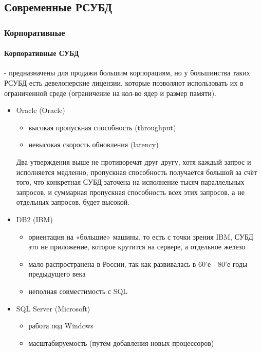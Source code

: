\subsection{Современные РСУБД}
\subsubsection{Корпоративные}

\paragraph{Корпоративные СУБД} - предназначены для продажи большим корпорациям, но у большинства
таких РСУБД есть девелоперские лицензии, которые позволяют использовать их в ограниченной среде (ограничение на кол-во ядер и размер памяти).

\begin{itemize}
	\item Oracle (Oracle)
	      \begin{itemize}
		      \item высокая пропускная способность (throughput)
		      \item невысокая скорость обновления (latency)
	      \end{itemize}
	      \begin{remark}
		      Два утверждения выше не противоречат друг другу, хотя каждый запрос и исполняется медленно, пропускная способность получается большой за счёт того, что конкретная СУБД заточена на исполнение тысяч параллельных запросов, и суммарная пропускная способность всех этих запросов, а не отдельных запросов, будет высокой.
	      \end{remark}
	\item DB2 (IBM)
	      \begin{itemize}
		      \item ориентация на «большие» машины, то есть с точки зрения IBM, СУБД это не приложение, которое крутится на сервере, а отдельное железо
		      \item мало распространена в России, так как развивалась в 60'е - 80'е годы предыдущего века
		      \item неполная совместимость с SQL
	      \end{itemize}
	\item SQL Server (Microsoft)
	      \begin{itemize}
		      \item работа под Windows
		      \item масштабируемость (путём добавления новых процессоров)
	      \end{itemize}
\end{itemize}

